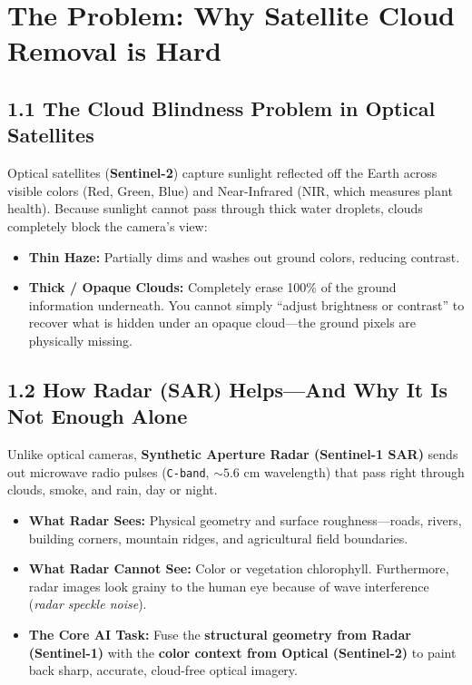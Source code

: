 \documentclass[11pt,a4paper]{article}
\begin{document}
\section{The Problem: Why Satellite Cloud Removal is Hard}

\subsection{1.1 The Cloud Blindness Problem in Optical Satellites}
Optical satellites (\textbf{Sentinel-2}) capture sunlight reflected off the Earth across visible colors (Red, Green, Blue) and Near-Infrared (NIR, which measures plant health). Because sunlight cannot pass through thick water droplets, clouds completely block the camera's view:
\begin{itemize}[leftmargin=1.5em, itemsep=2pt]
    \item \textbf{Thin Haze:} Partially dims and washes out ground colors, reducing contrast.
    \item \textbf{Thick / Opaque Clouds:} Completely erase 100\% of the ground information underneath. You cannot simply ``adjust brightness or contrast'' to recover what is hidden under an opaque cloud---the ground pixels are physically missing.
\end{itemize}

\subsection{1.2 How Radar (SAR) Helps---And Why It Is Not Enough Alone}
Unlike optical cameras, \textbf{Synthetic Aperture Radar (Sentinel-1 SAR)} sends out microwave radio pulses (\texttt{C-band}, $\sim 5.6\text{ cm}$ wavelength) that pass right through clouds, smoke, and rain, day or night.
\begin{itemize}[leftmargin=1.5em, itemsep=2pt]
    \item \textbf{What Radar Sees:} Physical geometry and surface roughness---roads, rivers, building corners, mountain ridges, and agricultural field boundaries.
    \item \textbf{What Radar Cannot See:} Color or vegetation chlorophyll. Furthermore, radar images look grainy to the human eye because of wave interference (\textit{radar speckle noise}).
    \item \textbf{The Core AI Task:} Fuse the \textbf{structural geometry from Radar (Sentinel-1)} with the \textbf{color context from Optical (Sentinel-2)} to paint back sharp, accurate, cloud-free optical imagery.
\end{itemize}
\end{document}
